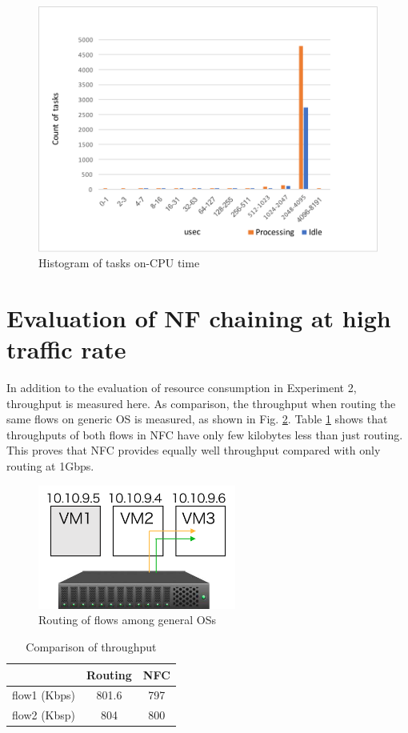 \begin{figure}
	\centering
	\includegraphics[width=120mm]{pics/cpudist.pdf}
	\caption{Histogram of tasks on-CPU time}
	\label{fig: cpudist}
\end{figure}

\section{Evaluation of NF chaining at high traffic rate}
In addition to the evaluation of resource consumption in Experiment 2, throughput is measured here. As comparison, the throughput when routing the same flows on generic OS is measured, as shown in Fig. \ref{fig: env2}. Table \ref{tbl: throughput} shows that throughputs of both flows in NFC have only few kilobytes less than just routing. This proves that NFC provides equally well throughput compared with only routing at 1Gbps.

\begin{figure}
	\centering
	\includegraphics[width=65mm]{pics/env2.pdf}
	\caption{Routing of flows among general OSs}
	\label{fig: env2}
\end{figure}

\begin{table}
	\centering
	\begin{tabular}{|c|c|c|}
	\hline
	 & Routing & NFC \\
	 \hline
	 flow1 (Kbps) & 801.6 & 797 \\
	 \hline
	 flow2 (Kbsp) & 804 & 800 \\
	 \hline
	\end{tabular}
	\caption{Comparison of throughput}
	\label{tbl: throughput}
\end{table}






